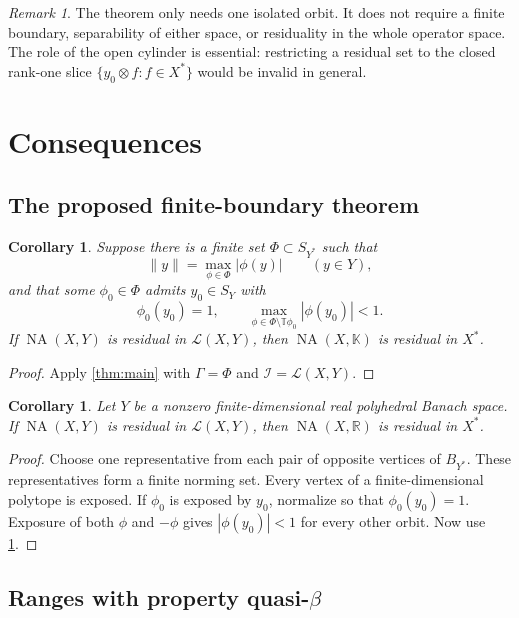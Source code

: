 \documentclass[11pt]{article}
\newtheorem{corollary}[theorem]{Corollary}
\theoremstyle{definition}
\theoremstyle{remark}
\newtheorem{remark}[theorem]{Remark}
\newcommand{\K}{\mathbb K}
\newcommand{\T}{\mathbb T}
\newcommand{\NA}{\operatorname{NA}}
\newcommand{\calL}{\mathcal L}
\newcommand{\norm}[1]{\lVert #1\rVert}
\newcommand{\Sphere}{S}
\begin{document}
\begin{remark}
The theorem only needs one isolated orbit.  It does not require a finite boundary, separability of either space, or residuality in the whole operator space.  The role of the open cylinder is essential: restricting a residual set to the closed rank-one slice $\{y_0\otimes f:f\in X^*\}$ would be invalid in general.
\end{remark}

\section{Consequences}

\subsection{The proposed finite-boundary theorem}

\begin{corollary}\label{cor:finiteboundary}
Suppose there is a finite set $\Phi\subset\Sphere_{Y^*}$ such that
\[
 \norm y=\max_{\phi\in\Phi}|\phi(y)|
 \qquad(y\in Y),
\]
and that some $\phi_0\in\Phi$ admits $y_0\in\Sphere_Y$ with
\[
 \phi_0(y_0)=1,
 \qquad
 \max_{\phi\in\Phi\setminus\T\phi_0}|\phi(y_0)|<1.
\]
If $\NA(X,Y)$ is residual in $\calL(X,Y)$, then $\NA(X,\K)$ is residual in $X^*$.
\end{corollary}

\begin{proof}
Apply \cref{thm:main} with $\Gamma=\Phi$ and $\mathcal I=\calL(X,Y)$.
\end{proof}

\begin{corollary}\label{cor:polyhedral}
Let $Y$ be a nonzero finite-dimensional real polyhedral Banach space.  If $\NA(X,Y)$ is residual in $\calL(X,Y)$, then $\NA(X,\mathbb R)$ is residual in $X^*$.
\end{corollary}

\begin{proof}
Choose one representative from each pair of opposite vertices of $B_{Y^*}$.  These representatives form a finite norming set.  Every vertex of a finite-dimensional polytope is exposed.  If $\phi_0$ is exposed by $y_0$, normalize so that $\phi_0(y_0)=1$.  Exposure of both $\phi$ and $-\phi$ gives
$|\phi(y_0)|<1$ for every other orbit.  Now use \cref{cor:finiteboundary}.
\end{proof}

\subsection{Ranges with property \texorpdfstring{quasi-$\beta$}{quasi-beta}}
\end{document}
